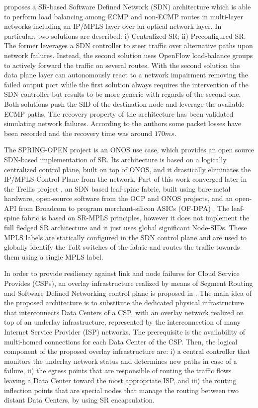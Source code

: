 \cite{castoldi2017segment} proposes a SR-based Software Defined Network (SDN) architecture which is able to perform load balancing among ECMP and non-ECMP routes in multi-layer networks including an IP/MPLS layer over an optical network layer. In particular, two solutions are described: i) Centralized-SR; ii) Preconfigured-SR. The former leverages a SDN controller to steer traffic over alternative paths upon network failures. Instead, the second solution uses OpenFlow load-balance groups to actively forward the traffic on several routes. With the second solution the data plane layer can autonomously react to a network impairment removing the failed output port while the first solution always requires the intervention of the SDN controller but results to be more generic with regards of the second one. Both solutions push the SID of the destination node and leverage the available ECMP paths. The recovery property of the architecture has been validated simulating network failures. According to the authors some packet losses have been recorded and the recovery time was around $170ms$.

The SPRING-OPEN project \cite{springopen} is an ONOS \cite{onos} use case, which provides an open source SDN-based implementation of SR. Its architecture is based on a logically centralized control plane, built on top of ONOS, and it drastically eliminates the IP/MPLS Control Plane from the network. Part of this work converged later in the Trellis project \cite{trellis}, an SDN based leaf-spine fabric, built using bare-metal hardware, open-source software from the OCP \cite{ocp} and ONOS projects, and an open-API from Broadcom \cite{brcm} to program merchant-silicon ASICs (OF-DPA) \cite{ofdpa}. The leaf-spine fabric is based on SR-MPLS principles, however it does not implement the full fledged SR architecture and it just uses global significant Node-SIDs. These MPLS labels are statically configured in the SDN control plane and are used to globally identify the ToR switches of the fabric and routes the traffic towards them using a single MPLS label.

In order to provide resiliency against link and node failures for Cloud Service Provides (CSPs), an overlay infrastructure realized by means of Segment Routing and Software Defined Networking control plane is proposed in \cite{fressancourt2015sdn}.
The main idea of the proposed architecture is to substitute the dedicated physical infrastructure that interconnects Data Centers of a CSP, with an overlay network realized on top of an underlay infrastructure, represented by the interconnection of many Internet Service Provider (ISP) networks.
The prerequisite is the availability of multi-homed connections for each Data Center of the CSP.
Then, the logical component of the proposed overlay infrastructure are: i) a central controller that monitors the underlay network status and determines new paths in case of a failure, ii) the egress points that are responsible of routing the traffic flows leaving a Data Center toward the most appropriate ISP, and iii) the routing inflection points that are special nodes that manage the routing between two distant Data Centers, by using SR encapsulation.

